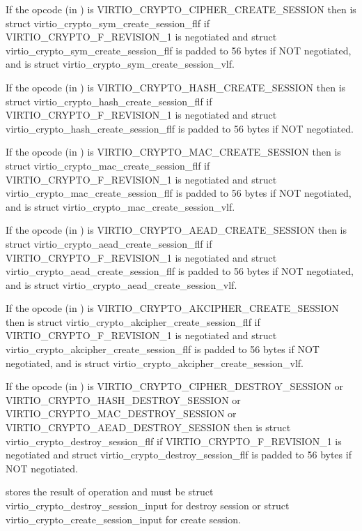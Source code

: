 \begin{itemize*}
\item If the opcode (in ) is VIRTIO_CRYPTO_CIPHER_CREATE_SESSION
    then  is struct virtio_crypto_sym_create_session_flf if
    VIRTIO_CRYPTO_F_REVISION_1 is negotiated and struct virtio_crypto_sym_create_session_flf is
    padded to 56 bytes if NOT negotiated, and  is struct
    virtio_crypto_sym_create_session_vlf.
\item If the opcode (in ) is VIRTIO_CRYPTO_HASH_CREATE_SESSION
    then  is struct virtio_crypto_hash_create_session_flf if
    VIRTIO_CRYPTO_F_REVISION_1 is negotiated and struct virtio_crypto_hash_create_session_flf is
    padded to 56 bytes if NOT negotiated.
\item If the opcode (in ) is VIRTIO_CRYPTO_MAC_CREATE_SESSION
    then  is struct virtio_crypto_mac_create_session_flf if
    VIRTIO_CRYPTO_F_REVISION_1 is negotiated and struct virtio_crypto_mac_create_session_flf is
    padded to 56 bytes if NOT negotiated, and  is struct
    virtio_crypto_mac_create_session_vlf.
\item If the opcode (in ) is VIRTIO_CRYPTO_AEAD_CREATE_SESSION
    then  is struct virtio_crypto_aead_create_session_flf if
    VIRTIO_CRYPTO_F_REVISION_1 is negotiated and struct virtio_crypto_aead_create_session_flf is
    padded to 56 bytes if NOT negotiated, and  is struct
    virtio_crypto_aead_create_session_vlf.
\item If the opcode (in ) is VIRTIO_CRYPTO_AKCIPHER_CREATE_SESSION
    then  is struct virtio_crypto_akcipher_create_session_flf if
    VIRTIO_CRYPTO_F_REVISION_1 is negotiated and struct virtio_crypto_akcipher_create_session_flf is
    padded to 56 bytes if NOT negotiated, and  is struct
    virtio_crypto_akcipher_create_session_vlf.
\item If the opcode (in ) is VIRTIO_CRYPTO_CIPHER_DESTROY_SESSION
    or VIRTIO_CRYPTO_HASH_DESTROY_SESSION or VIRTIO_CRYPTO_MAC_DESTROY_SESSION or
    VIRTIO_CRYPTO_AEAD_DESTROY_SESSION then  is struct
    virtio_crypto_destroy_session_flf if VIRTIO_CRYPTO_F_REVISION_1 is negotiated and
    struct virtio_crypto_destroy_session_flf is padded to 56 bytes if NOT negotiated.
\end{itemize*}

 stores the result of operation and must be struct
virtio_crypto_destroy_session_input for destroy session or
struct virtio_crypto_create_session_input for create session.

